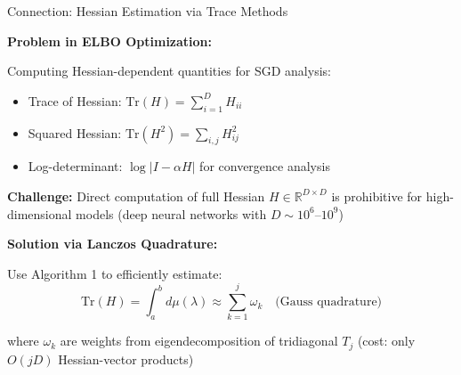 \documentclass[aspectratio=169, 12pt]{beamer}
\begin{document}
\begin{frame}{Connection: Hessian Estimation via Trace Methods}

\textbf{Problem in ELBO Optimization:}

Computing Hessian-dependent quantities for SGD analysis:
\begin{itemize}
    \item Trace of Hessian: \(\text{Tr}(H) = \sum_{i=1}^D H_{ii}\)
    \item Squared Hessian: \(\text{Tr}(H^2) = \sum_{i,j} H_{ij}^2\)
    \item Log-determinant: \(\log|I - \alpha H|\) for convergence analysis
\end{itemize}

\vspace{0.3cm}

\textbf{Challenge:} Direct computation of full Hessian \(H \in \mathbb{R}^{D \times D}\) is prohibitive for high-dimensional models (deep neural networks with \(D \sim 10^6\)--\(10^9\))

\vspace{0.3cm}

\textbf{Solution via Lanczos Quadrature:}

Use Algorithm 1 to \alert{efficiently estimate}:
\[
\text{Tr}(H) = \int_a^b d\mu(\lambda) \approx \sum_{k=1}^j \omega_k \quad \text{(Gauss quadrature)}
\]

where \(\omega_k\) are weights from eigendecomposition of tridiagonal \(T_j\) (cost: only \(O(jD)\) Hessian-vector products)

\end{frame}
\end{document}

